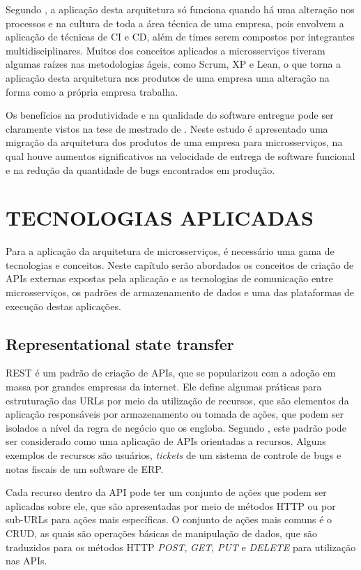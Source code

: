 Segundo , a aplicação desta arquitetura só funciona
quando há uma alteração nos processos e na cultura de toda a área técnica
de uma empresa, pois envolvem a aplicação de técnicas de \ac{CI} e \ac{CD},
além de times serem compostos por integrantes multidisciplinares. Muitos dos
conceitos aplicados a microsserviços tiveram algumas raízes nas metodologias
ágeis, como Scrum, XP e Lean, o que torna a aplicação desta arquitetura nos
produtos de uma empresa uma alteração na forma como a própria empresa trabalha.

Os benefícios na produtividade e na qualidade do software entregue pode
ser claramente vistos na tese de mestrado de . Neste
estudo é apresentado uma migração da arquitetura dos produtos de uma empresa
para microsserviços, na qual houve aumentos significativos na velocidade de
entrega de software funcional e na redução da quantidade de bugs encontrados
em produção.

\section{TECNOLOGIAS APLICADAS}

Para a aplicação da arquitetura de microsserviços, é necessário uma gama de
tecnologias e conceitos. Neste capítulo serão abordados os conceitos de criação
de APIs externas expostas pela aplicação e as tecnologias de comunicação entre
microsserviços, os padrões de armazenamento de dados e uma das plataformas de
execução destas aplicações.

\subsection{Representational state transfer}

\ac{REST} é um padrão de criação de \acp{API}, que se popularizou com a
adoção em massa por grandes empresas da internet. Ele define algumas práticas
para estruturação das \acp{URL} por meio da utilização de recursos, que são
elementos da aplicação responsáveis por armazenamento ou tomada de ações, que
podem ser isolados a nível da regra de negócio que os engloba. Segundo
, este padrão pode ser considerado como uma aplicação
de \acp{API} orientadas a recursos. Alguns exemplos de recursos são usuários,
\emph{tickets} de um sistema de controle de bugs e notas fiscais de um
software de \ac{ERP}.

Cada recurso dentro da \ac{API} pode ter um conjunto de ações que podem ser
aplicadas sobre ele, que são apresentadas por meio de métodos \ac{HTTP} ou
por sub-\acp{URL} para ações mais específicas. O conjunto de ações mais
comuns é o \ac{CRUD}, as quais são operações básicas de manipulação de dados,
que são traduzidos para os métodos \ac{HTTP} \emph{POST}, \emph{GET},
\emph{PUT} e \emph{DELETE} para utilização nas \acp{API}.

